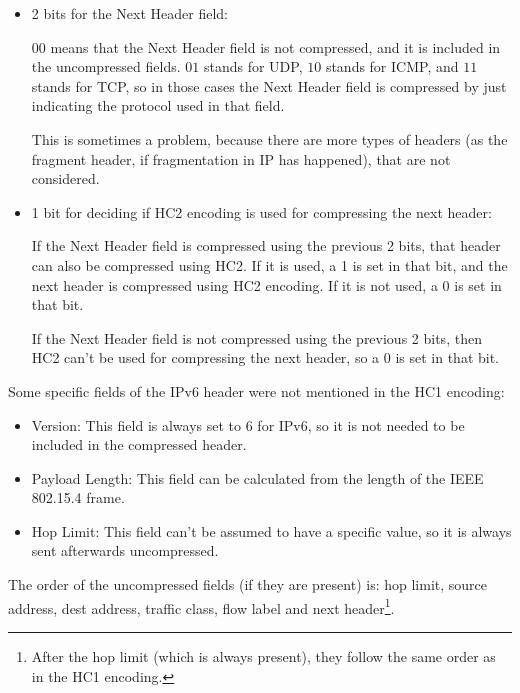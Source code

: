 \begin{itemize}
\begin{itemize}
        If both fields are assumed to be 0 (which is the most common case), a 1 is set in that bit. If they are not assumed, a 0 is set in that bit, and both fields are included in the uncompressed fields.
        
        \item 2 bits for the Next Header field:
        
        $00$ means that the Next Header field is not compressed, and it is included in the uncompressed fields. $01$ stands for UDP, $10$ stands for ICMP, and $11$ stands for TCP, so in those cases the Next Header field is compressed by just indicating the protocol used in that field.

        This is sometimes a problem, because there are more types of headers (as the fragment header, if fragmentation in IP has happened), that are not considered.

        \item 1 bit for deciding if HC2 encoding is used for compressing the next header:
        
        If the Next Header field is compressed using the previous 2 bits, that header can also be compressed using HC2. If it is used, a 1 is set in that bit, and the next header is compressed using HC2 encoding. If it is not used, a 0 is set in that bit.

        If the Next Header field is not compressed using the previous 2 bits, then HC2 can't be used for compressing the next header, so a 0 is set in that bit.
    \end{itemize}

    Some specific fields of the IPv6 header were not mentioned in the HC1 encoding:
    \begin{itemize}
        \item Version: This field is always set to 6 for IPv6, so it is not needed to be included in the compressed header.
        \item Payload Length: This field can be calculated from the length of the IEEE 802.15.4 frame.
        \item Hop Limit: This field can't be assumed to have a specific value, so it is always sent afterwards uncompressed.
    \end{itemize}

    The order of the uncompressed fields (if they are present) is: hop limit, source address, dest address, traffic class, flow label and next header\footnote{After the hop limit (which is always present), they follow the same order as in the HC1 encoding.}.


\end{itemize}
